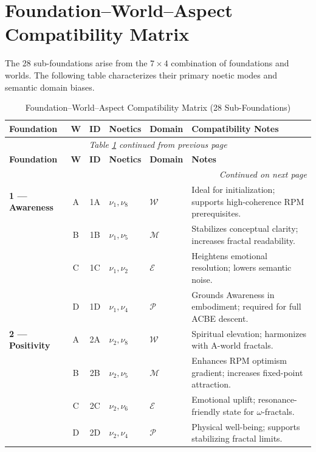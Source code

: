 \section{Foundation--World--Aspect Compatibility Matrix}

The 28 sub-foundations arise from the $7 \times 4$ combination of foundations
and worlds. The following table characterizes their primary noetic modes and
semantic domain biases.

\renewcommand{\arraystretch}{1.25}
\small
\begin{longtable}{p{1.8cm}|c|c|p{1.5cm}|p{1.5cm}|p{4.5cm}}
\caption{Foundation--World--Aspect Compatibility Matrix (28 Sub-Foundations)}
\label{tab:28-subfoundation-matrix} \\
\toprule
\textbf{Foundation}
& \textbf{W}
& \textbf{ID}
& \textbf{Noetics}
& \textbf{Domain}
& \textbf{Compatibility Notes}
\\
\midrule
\endfirsthead
\multicolumn{6}{c}{\textit{Table \ref{tab:28-subfoundation-matrix} continued from previous page}} \\
\toprule
\textbf{Foundation}
& \textbf{W}
& \textbf{ID}
& \textbf{Noetics}
& \textbf{Domain}
& \textbf{Notes}
\\
\midrule
\endhead
\midrule
\multicolumn{6}{r}{\textit{Continued on next page}} \\
\endfoot
\bottomrule
\endlastfoot

\textbf{1 --- Awareness}
& A & 1A &
$\nu_1, \nu_8$ &
$\mathcal{W}$ &
Ideal for initialization; supports high-coherence RPM prerequisites.
\\
& B & 1B &
$\nu_1, \nu_5$ &
$\mathcal{M}$ &
Stabilizes conceptual clarity; increases fractal readability.
\\
& C & 1C &
$\nu_1, \nu_2$ &
$\mathcal{E}$ &
Heightens emotional resolution; lowers semantic noise.
\\
& D & 1D &
$\nu_1, \nu_4$ &
$\mathcal{P}$ &
Grounds Awareness in embodiment; required for full ACBE descent.
\\
\midrule

\textbf{2 --- Positivity}
& A & 2A &
$\nu_2, \nu_8$ &
$\mathcal{W}$ &
Spiritual elevation; harmonizes with A-world fractals.
\\
& B & 2B &
$\nu_2, \nu_5$ &
$\mathcal{M}$ &
Enhances RPM optimism gradient; increases fixed-point attraction.
\\
& C & 2C &
$\nu_2, \nu_6$ &
$\mathcal{E}$ &
Emotional uplift; resonance-friendly state for $\omega$-fractals.
\\
& D & 2D &
$\nu_2, \nu_4$ &
$\mathcal{P}$ &
Physical well-being; supports stabilizing fractal limits.
\\
\midrule


\end{longtable}
